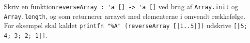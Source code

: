 Skriv en funktion\mbox{\lstinline{reverseArray : 'a [] -> 'a []}} ved brug af \lstinline{Array.init} og \lstinline{Array.length}, og som returnerer arrayet med elementerne i omvendt rækkefølge.  For eksempel skal kaldet \lstinline{printfn "%A" (reverseArray [|1..5|])} %
    udskrive \mbox{\lstinline{[|5; 4; 3; 2; 1|]}}.
